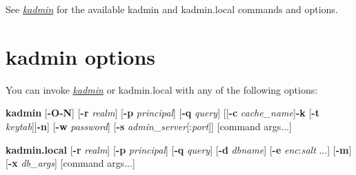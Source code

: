 \documentclass[letterpaper,10pt,english]{sphinxmanual}
\begin{document}
See {\hyperref[admin/admin_commands/kadmin_local:kadmin-1]{\emph{kadmin}}} for the available kadmin and kadmin.local
commands and options.


\section{kadmin options}
\label{admin/database:kadmin-options}
You can invoke {\hyperref[admin/admin_commands/kadmin_local:kadmin-1]{\emph{kadmin}}} or kadmin.local with any of the
following options:

\textbf{kadmin}
{[}\textbf{-O}\textbar{}\textbf{-N}{]}
{[}\textbf{-r} \emph{realm}{]}
{[}\textbf{-p} \emph{principal}{]}
{[}\textbf{-q} \emph{query}{]}
{[}{[}\textbf{-c} \emph{cache\_name}{]}\textbar{}{[}\textbf{-k} {[}\textbf{-t} \emph{keytab}{]}{]}\textbar{}\textbf{-n}{]}
{[}\textbf{-w} \emph{password}{]}
{[}\textbf{-s} \emph{admin\_server}{[}:\emph{port}{]}{]}
{[}command args...{]}

\textbf{kadmin.local}
{[}\textbf{-r} \emph{realm}{]}
{[}\textbf{-p} \emph{principal}{]}
{[}\textbf{-q} \emph{query}{]}
{[}\textbf{-d} \emph{dbname}{]}
{[}\textbf{-e} \emph{enc}:\emph{salt} ...{]}
{[}\textbf{-m}{]}
{[}\textbf{-x} \emph{db\_args}{]}
{[}command args...{]}
\end{document}

